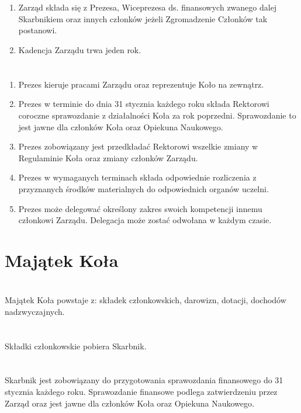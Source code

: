 \documentclass[a4paper]{article}
\begin{document}
\section{}
\begin{enumerate}
\item Zarząd składa się z Prezesa, Wiceprezesa ds. finansowych zwanego dalej Skarbnikiem oraz innych członków jeżeli Zgromadzenie Członków tak postanowi.
\item Kadencja Zarządu trwa jeden rok.
\end{enumerate}

\section{}
\begin{enumerate}
\item Prezes kieruje pracami Zarządu oraz reprezentuje Koło na zewnątrz.
\item Prezes w terminie do dnia 31 stycznia każdego roku składa Rektorowi coroczne sprawozdanie z działalności Koła za rok poprzedni. Sprawozdanie to jest jawne dla członków Koła oraz Opiekuna Naukowego.
\item Prezes zobowiązany jest przedkładać Rektorowi wszelkie zmiany w Regulaminie Koła oraz zmiany członków Zarządu.
\item Prezes w wymaganych terminach składa odpowiednie rozliczenia z przyznanych środków materialnych do odpowiednich organów uczelni.
\item Prezes może delegować określony zakres swoich kompetencji innemu członkowi Zarządu. Delegacja może zostać odwołana w każdym czasie.
\end{enumerate}

\section*{Majątek Koła~~~}
\section{}
Majątek Koła powstaje z: składek członkowskich, darowizn, dotacji, dochodów nadzwyczajnych.
 
\section{}
Składki członkowskie pobiera Skarbnik.
 
\section{}
Skarbnik jest zobowiązany do przygotowania sprawozdania finansowego do 31 stycznia każdego roku. Sprawozdanie finansowe podlega zatwierdzeniu przez Zarząd oraz jest jawne dla członków Koła oraz Opiekuna Naukowego.
\end{document}
